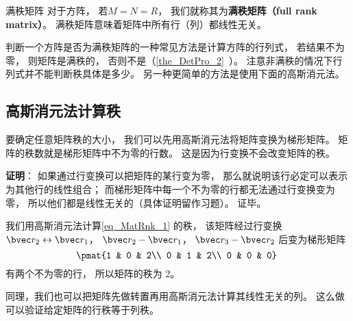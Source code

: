 \begin{definition}{满秩矩阵}
对于方阵， 若$M = N = R$， 我们就称其为\textbf{满秩矩阵（full rank matrix）}。 满秩矩阵意味着矩阵中所有行（列）都线性无关。
\end{definition}

判断一个方阵是否为满秩矩阵的一种常见方法是计算方阵的行列式， 若结果不为零， 则矩阵是满秩的， 否则不是（\autoref{the_DetPro_2}~）。 注意非满秩的情况下行列式并不能判断秩具体是多少。 另一种更简单的方法是使用下面的高斯消元法。

\subsection{高斯消元法计算秩}
要确定任意矩阵秩的大小， 我们可以先用高斯消元法将矩阵变换为梯形矩阵。 矩阵的秩数就是梯形矩阵中不为零的行数。 这是因为行变换不会改变矩阵的秩。

\textbf{证明}： 如果通过行变换可以把矩阵的某行变为零， 那么就说明该行必定可以表示为其他行的线性组合； 而梯形矩阵中每一个不为零的行都无法通过行变换变为零， 所以他们都是线性无关的（具体证明留作习题）。 证毕。

\begin{example}{}
我们用高斯消元法计算\autoref{eq_MatRnk_1} 的秩， 该矩阵经过行变换 $\bvec r_2 \leftrightarrow \bvec r_1$， $\bvec r_2 - \bvec r_1$， $\bvec r_3 - \bvec r_2$ 后变为梯形矩阵
\begin{equation}
\pmat{1 & 0 & 2\\ 0 & 1 & 2\\ 0 & 0 & 0}~
\end{equation}
有两个不为零的行， 所以矩阵的秩为 2。
\end{example}

同理，我们也可以把矩阵先做转置再用高斯消元法计算其线性无关的列。 这么做可以验证给定矩阵的行秩等于列秩。
